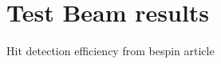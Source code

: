 






\section{Test Beam results}

Hit detection efficiency from bespin article

\begin{comment}
So with this test we have fully characterized the main features of the chip W14R12, which are then used to interpret data from Test Beam in June 2022 in Desy.

In the following some of the results obtained:
\end{comment}













































\begin{comment}

The ultimate purpose of this measurement is to describe (characterize) the response of each pixel by injecting a charge equivalent to the typical energy released from particles emitted in decays of radioactive materials. As explained in the previous section (reference), for example the \ch{^{55}Fe} has an emission spectrum with quite sharp lines and this allows to compare data more easily. The first line is at 5.9 KeV which corresponds on average to about 1616 $e^{-}$ released (through the pixel??).

\begin{figure}[h!]
\centering
\texttt{[image: spectrum\_fe]}
\caption{\ch{^{55}Fe} (radioactive source) emission spectrum using the analog output of a PMOS reset front-end of TJ-Monopix 1. (reference)}
\label{fig:fespectrum}
\end{figure}

\end{comment}

